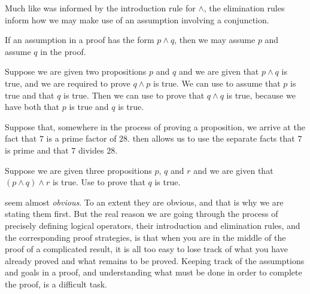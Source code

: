 Much like  was informed by the introduction rule for $\wedge$, the elimination rules inform how we may make use of an assumption involving a conjunction.

\begin{strategy}
\label{strAssumingConjunctionsDirect}
If an assumption in a proof has the form $p \wedge q$, then we may assume $p$ and assume $q$ in the proof.
\end{strategy}

\begin{example}
\label{exAssumingConjunctionsAbstract}
Suppose we are given two propositions $p$ and $q$ and we are given that $p \wedge q$ is true, and we are required to prove $q \wedge p$ is true.
We can use  to assume that $p$ is true and that $q$ is true. Then we can use  to prove that $q \wedge q$ is true, because we have both that $p$ is true and $q$ is true. 
\end{example}

\begin{example}
\label{exSevenDividesTwentyEightConjunctionAssumption}
Suppose that, somewhere in the process of proving a proposition, we arrive at the fact that $7$ is a prime factor of $28$.  then allows us to use the separate facts that $7$ is prime and that $7$ divides $28$.
\end{example}

\begin{exercise}
Suppose we are given three propositions $p$, $q$ and $r$ and we are given that $(p \wedge q) \wedge r$ is true.
Use  to prove that $q$ is true. 
\end{exercise}

 seem almost \textit{obvious}. To an extent they are obvious, and that is why we are stating them first. But the real reason we are going through the process of precisely defining logical operators, their introduction and elimination rules, and the corresponding proof strategies, is that when you are in the middle of the proof of a complicated result, it is all too easy to lose track of what you have already proved and what remains to be proved. Keeping track of the assumptions and goals in a proof, and understanding what must be done in order to complete the proof, is a difficult task.

